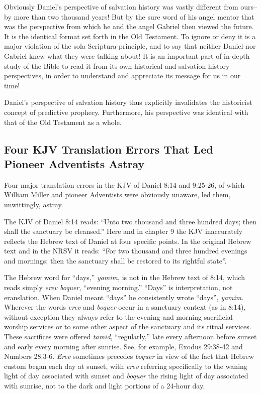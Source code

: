 Obviously Daniel's perspective of salvation history was vastly different
from ours--by more than two thousand years! But by the sure word of his
angel mentor that was the perspective from which he and the angel Gabriel
then viewed the future. It is the identical format set forth in the Old
Testament. To ignore or deny it is a major violation of the sola Scriptura
principle, and to say that neither Daniel nor Gabriel knew what they were
talking about! It is an important part of in-depth study of the Bible to 
read it from its own historical and salvation history perspectives, in order
to understand and appreciate its message for us in our time!

Daniel's perspective of salvation history thus explicitly invalidates the
historicist concept of predictive prophecy. Furthermore, his perspective was
identical with that of the Old Testament as a whole.

\subsection{Four KJV Translation Errors That Led Pioneer Adventists Astray}

Four major translation errors in the KJV of Daniel 8:14 and 9:25-26, of
which William Miller and pioneer Adventists were obviously unaware, led
them, unwittingly, astray.

The KJV of Daniel 8:14 reads: ``Unto two thousand and three hundred days;
then shall the sanctuary be cleansed.'' Here and in chapter 9 the KJV
inaccurately reflects the Hebrew text of Daniel at four specific points. In
the original Hebrew text and in the NRSV it reads: ``For two thousand and
three hundred evenings and mornings; then the sanctuary shall be restored
to its rightful state''.

The Hebrew word for ``days,'' \textit{yamim}, is not in the Hebrew text of 8:14, which
reads simply \textit{erev boquer}, ``evening morning.'' ``Days'' is interpretation, not
eranslation. When Daniel meant ``days'' he consistently wrote ``days'',
\textit{yamim}. Wherever the words \textit{erev} and \textit{boquer} occur in a sanctuary context
(as in 8:14), without exception they always refer to the evening and morning
sacrificial worship services or to some other aspect of the sanctuary and
its ritual services. These sacrifices were offered \textit{tamid}, ``regularly,'' late
every afternoon before sunset and early every morning after sunrise. See,
for example, Exodus 29:38-42 and Numbers 28:3-6. \textit{Erev} sometimes precedes
\textit{boquer} in view of the fact that Hebrew custom began each day at sunset, with
\textit{erev} referring specifically to the waning light of day associated with
sunset and \textit{boquer} the rising light of day associated with sunrise, not to
the dark and light portions of a 24-hour day.

